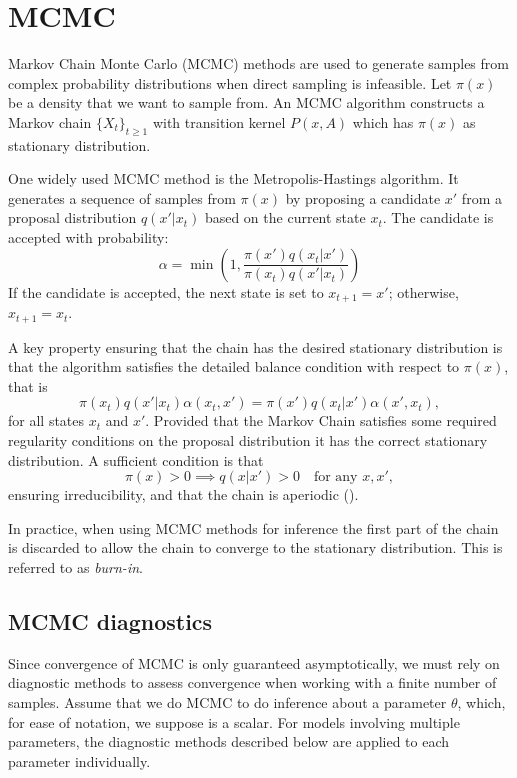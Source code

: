 \chapter{MCMC}
\label{chp:appendixMCMC}

Markov Chain Monte Carlo (MCMC) methods are used to generate samples from complex probability distributions when direct sampling is infeasible. Let $\pi(x)$ be a density that we want to sample from. An MCMC algorithm constructs a Markov chain $\{X_t\}_{t\geq 1}$ with transition kernel $P(x, A)$ which has $\pi(x)$ as stationary distribution. 

One widely used MCMC method is the Metropolis-Hastings algorithm. It generates a sequence of samples from $\pi(x)$ by proposing a candidate $x'$ from a proposal distribution $q(x'|x_t)$ based on the current state $x_t$. The candidate is accepted with probability:
\[
	\alpha = \min\left(1, \frac{\pi(x') q(x_t | x')}{\pi(x_t) q(x' | x_t)}\right)
\]
If the candidate is accepted, the next state is set to $x_{t+1} = x'$; otherwise, $x_{t+1} = x_t$. 

A key property ensuring that the chain has the desired stationary distribution is that the algorithm satisfies the detailed balance condition with respect to $\pi(x)$, that is
\[
	\pi(x_t)q(x'\vert x_t)\alpha(x_t, x')=\pi(x')q(x_t\vert x')\alpha(x', x_t),
\]
for all states $x_t$ and $x'$. Provided that the Markov Chain satisfies some required regularity conditions on the proposal distribution it has the correct stationary distribution. A sufficient condition is that 
\[\pi(x)>0 \implies q(x \vert x')>0 \quad \text{for any } x, x',\]
ensuring irreducibility, and that the chain is aperiodic (\cite{robert_monte_2004}).



In practice, when using \gls*{MCMC} methods for inference the first part of the chain is discarded to allow the chain to converge to the stationary distribution. This is referred to as \emph{burn-in}.

\section*{MCMC diagnostics}
Since convergence of \gls*{MCMC} is only guaranteed asymptotically, we must rely on diagnostic methods to assess convergence when working with a finite number of samples. Assume that we do MCMC to do inference about a parameter $\theta$, which, for ease of notation, we suppose is a scalar. For models involving multiple parameters, the diagnostic methods described below are applied to each parameter individually.
 
